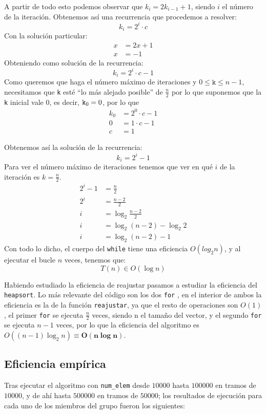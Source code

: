 \documentclass[10pt, a4paper]{article}
\theoremstyle{theorem-style}
\theoremstyle{theorem-style}
\theoremstyle{definition-style}
\theoremstyle{remark-style}
\theoremstyle{example-style}
\theoremstyle{definition-style}
\theoremstyle{remark-style}
\begin{document}
A partir de todo esto podemos observar que $k_{i} = 2k_{i-1} + 1$, siendo $i$ el número de la iteración. Obtenemos así una recurrencia que procedemos a resolver:
$$k_i = 2^i \cdot c$$
Con la solución particular:
\begin{align*}
x &= 2x +1 \\
x &= -1
\end{align*}
Obteniendo como solución de la recurrencia:
$$k_i = 2^i \cdot c -1$$
Como queremos que haga el número máximo de iteraciones y $0 \leq \texttt{k} \leq n-1$, necesitamos que \texttt{k} esté ``lo más alejado posible'' de $\frac{n}{2}$ por lo que suponemos que la \texttt{k} inicial vale 0, es decir, $\text{\texttt{k}}_0 = 0$, por lo que
\begin{align*}
k_0 &= 2^0 \cdot c -1\\
0 &= 1 \cdot c -1\\
c &= 1
\end{align*}

Obtenemos así la solución de la recurrencia: $$k_i = 2^i -1$$
Para ver el número máximo de iteraciones tenemos que ver en qué $i$ de la iteración es $k = \frac{n}{2}$.
\begin{align*}
2^i - 1 &= \frac{n}{2}\\
2^i &= \frac{n-2}{2}\\
i &= \log_2{\frac{n-2}{2}}\\
i&=\log_2(n-2) - \log_2{2}\\
i&=\log_2(n-2) -1
\end{align*}
Con todo lo dicho, el cuerpo del \texttt{while} tiene una eficiencia $O(log_2{n})$, y al ejecutar el bucle $n$ veces, tenemos que: $$T(n) \in O(\log n)$$


Habiendo estudiado la eficiencia de reajustar pasamos a estudiar la eficiencia del \texttt{heapsort}. Lo más relevante del código son los dos \texttt{for} , en el interior de ambos la eficiencia es la de la función \texttt{reajustar}, ya que el resto de operaciones son $O(1)$, el primer \texttt{for} se ejecuta $\frac{n}{2}$ veces, siendo n el tamaño del vector, y el segundo \texttt{for} se ejecuta $n-1$ veces, por lo que la eficiencia del algoritmo es $O((n-1)\log_2{n}) \equiv \boldsymbol{O(n\log{n})}$.

\subsection{Eficiencia empírica}

Tras ejecutar el algoritmo con \texttt{num\_elem} desde $10000$ hasta $100000$ en tramos de $10000$, y de ahí hasta $500000$ en tramos de $50000$; los resultados de ejecución para cada uno de los miembros del grupo fueron los siguientes:
\end{document}

